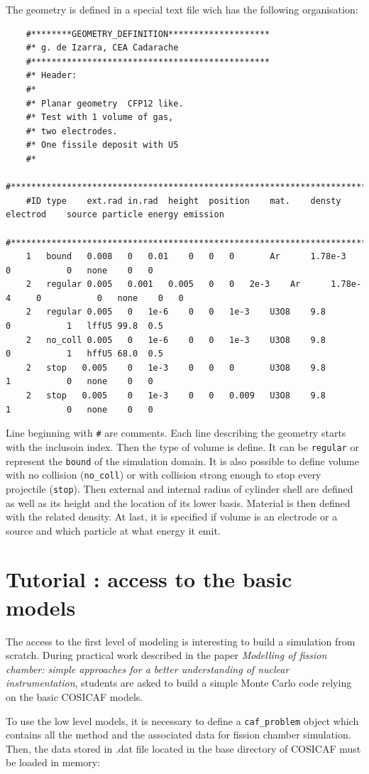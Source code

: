 \documentclass[10pt]{article}
\begin{document}
	The geometry is defined in a special text file wich has the following organisation:
	
	\begin{lstlisting}
	#********GEOMETRY_DEFINITION********************
	#* g. de Izarra, CEA Cadarache 
	#***********************************************
	#* Header: 
	#* 
	#* Planar geometry  CFP12 like. 
	#* Test with 1 volume of gas,
	#* two electrodes.
	#* One fissile deposit with U5
	#*
	#***********************************************************************
	#ID	type	ext.rad	in.rad	height	position	mat.	densty  electrod	source particle energy emission
	#***********************************************************************
	1	bound   0.008	0	0.01	0	0	0		Ar		1.78e-3		0			0	none	0	0
	2	regular	0.005	0.001	0.005	0	0	2e-3	Ar		1.78e-4		0			0	none	0	0	
	2	regular	0.005	0	1e-6	0	0	1e-3	U3O8	9.8			0			1	lffU5 99.8	0.5
	2	no_coll	0.005	0	1e-6	0	0	1e-3	U3O8	9.8			0			1	hffU5 68.0	0.5
	2	stop   0.005	0	1e-3	0	0	0		U3O8	9.8			1			0	none	0	0
	2	stop   0.005	0	1e-3	0	0	0.009	U3O8	9.8			1			0 	none	0	0	
	\end{lstlisting}
	
	Line beginning with \lstinline{#} are comments. Each line describing the geometry starts with the inclusoin index. Then the type of volume is define. It can be \lstinline{regular} or represent the \lstinline{bound}
	 of the  simulation domain. It is also possible to define volume with no collision (\lstinline{no_coll}) or with collision strong enough to stop every projectile  (\lstinline{stop}). Then external and internal radius of cylinder shell are defined as well as its height and the location of its lower basis. Material is then defined with the related density. At last, it is specified if volume is an electrode or a source and which particle at what energy it emit.
	  
	
	\section{Tutorial : access to the basic models}
	The access to the first level of modeling is interesting to build a simulation from scratch. During practical work described in the paper {\it{}Modelling of fission chamber: simple approaches for a better understanding of nuclear instrumentation}, students are asked to build a simple Monte Carlo code relying on the basic COSICAF models.
	
	To use the low level models, it is necessary to define a \lstinline{caf_problem} object which contains all the method and the associated data for fission chamber simulation. Then, the data stored in .dat file located in the base directory of COSICAF must be loaded in memory:
	
\end{document}
